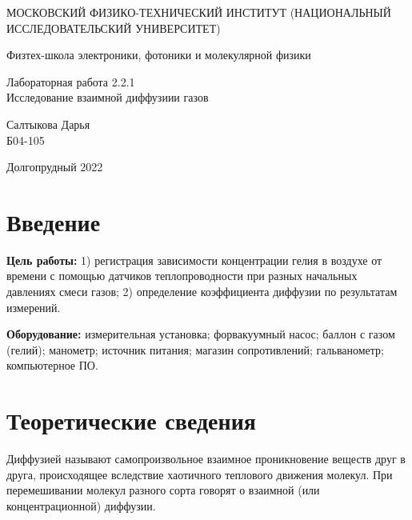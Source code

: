 \documentclass[a4paper,12pt]{article} %
\begin{document}
	
	\begin{titlepage}
	\begin{center}
		{\large МОСКОВСКИЙ ФИЗИКО-ТЕХНИЧЕСКИЙ ИНСТИТУТ (НАЦИОНАЛЬНЫЙ ИССЛЕДОВАТЕЛЬСКИЙ УНИВЕРСИТЕТ)}
	\end{center}
	\begin{center}
		{\large Физтех-школа электроники, фотоники и молекулярной физики}
	\end{center}
	
	
	\vspace{4.5cm}
	{\huge
		\begin{center}
			{Лабораторная работа 2.2.1}\\
			Исследование взаимной диффузиии газов
		\end{center}
	}
	\vspace{2cm}
	\begin{flushright}
		{\LARGE Салтыкова Дарья \\
			\vspace{0.5cm}
			Б04-105}
	\end{flushright}
	\vspace{8cm}
	\begin{center}
		Долгопрудный 2022
	\end{center}
\end{titlepage}

\section{Введение}

\noindent
\textbf{Цель работы:} 1) регистрация зависимости концентрации гелия в воздухе от времени с помощью датчиков теплопроводности при разных начальных давлениях смеси газов; 2) определение коэффициента диффузии по результатам измерений.
\medskip

\noindent \textbf{Оборудование:} измерительная установка; форвакуумный насос; баллон с газом (гелий); манометр; источник питания; магазин сопротивлений; гальванометр; компьютерное ПО.

\medskip

\section{Теоретические сведения}

\medskip

\noindent Диффузией называют самопроизвольное взаимное проникновение веществ друг в друга, происходящее вследствие хаотичного теплового движения молекул. При перемешивании молекул разного сорта говорят о взаимной (или концентрационной) диффузии.
\end{document}
